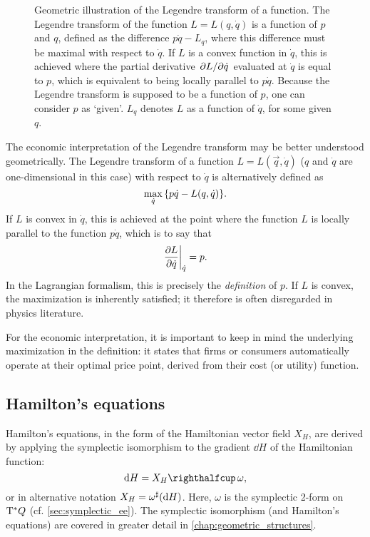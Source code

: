 \begin{figure}[ht]
    \centering
    
    \caption{Geometric illustration of the Legendre transform of a function. The Legendre transform of the function $L = L(q, \dot{q})$ is a function of $p$ and $q$, defined as the difference $p\dot{q} - L_q$, where this difference must be maximal with respect to $\dot{q}$. If $L$ is a convex function in $\dot{q}$, this is achieved where the partial derivative $\pdv*{L}{\dot{q}}$ evaluated at $\dot{q}$ is equal to $p$, which is equivalent to being locally parallel to $p\dot{q}$. Because the Legendre transform is supposed to be a function of $p$, one can consider $p$ as `given'. $L_q$ denotes $L$ as a function of $\dot{q}$, for some given $q$.} 
    \label{fig:my_label}
\end{figure}

The economic interpretation of the Legendre transform may be better understood geometrically. The Legendre transform of a function $L = L(\vec{q}, \dot{q})$ ($q$ and $\dot{q}$ are one-dimensional in this case) with respect to $\dot{q}$ is alternatively defined as
\begin{equation}
    \max_{\dot{q}}\qty{p\dot{q} - L(q, \dot{q})}.
\end{equation}
If $L$ is convex in $\dot{q}$, this is achieved at the point where the function $L$ is locally parallel to the function $p\dot{q}$, which is to say that
\begin{equation}
    \left.\pdv{L}{\dot{q}}\right |_{\dot{q}} = p.
\end{equation}
In the Lagrangian formalism, this is precisely the \emph{definition} of $p$. If $L$ is convex, the maximization is inherently satisfied; it therefore is often disregarded in physics literature.

For the economic interpretation, it is important to keep in mind the underlying maximization in the definition: it states that firms or consumers automatically operate at their optimal price point, derived from their cost (or utility) function.

\subsection{Hamilton's equations} 
Hamilton's equations, in the form of the Hamiltonian vector field $X_H$, are derived by applying the symplectic isomorphism to the gradient $\dd{H}$ of the Hamiltonian function:
\begin{equation}
    \dd{H} = \intpr{X_H}{\omega},
\end{equation}
or in alternative notation \(X_H = \omega^\sharp(\dd{H})\). Here, $\omega$ is the symplectic 2-form on $\mathrm{T}^*Q$ (cf. \cref{sec:symplectic_ee}). The symplectic isomorphism (and Hamilton's equations) are covered in greater detail in \cref{chap:geometric_structures}.

